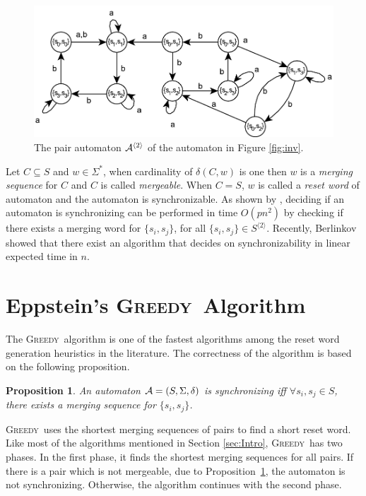 \documentclass[12pt]{article}
\newcommand{\kkcomm}[1]{{\color{red}{\bf kk: #1}}}
\newtheorem{proposition}{Proposition}[section]
\newcommand{\greedyAlgo}{\textsc{Greedy}}
\begin{document}
\begin{figure}[ht]
	\centering
	\includegraphics[width=\textwidth]{figs/pair.pdf}
	\caption{The pair automaton ${\cal A}^{\langle 2 \rangle}$ of the automaton in Figure \ref{fig:inv}.}
	\label{fig:pair}
\end{figure}

Let $C \subseteq S$ and $w \in \Sigma^*$, when cardinality of $\delta(C,w)$ is one then $w$ is a \textit{merging sequence} for $C$ and $C$ is called \textit{mergeable}. When $C=S$, $w$ is called a \textit{reset word} of automaton and the automaton is synchronizable. As shown by \cite{Eppstein90}, deciding if an automaton is synchronizing can be performed in time $O(pn^2)$ by checking if there exists a merging word for $\{ s_i, s_j \}$, for all  $\{ s_i, s_j \} \in S^{\langle 2 \rangle}$. 
Recently, Berlinkov \cite{Berlinkov2016} showed that there exist an algorithm that decides on synchronizability in linear expected time in $n$. 

\kkcomm{define Cerny automata here}

\clearpage
\section{Eppstein's \greedyAlgo\ Algorithm}
\label{sec:greedy}

The \greedyAlgo\ algorithm is one of the fastest algorithms among the reset word generation heuristics in the literature. The correctness of the algorithm is based on the following proposition.

\begin{proposition}
	\label{prop:synchronizable}
	An automaton ${\cal A}=(S,\Sigma,\delta)$ is synchronizing iff $\forall s_i,s_j \in S$, there exists a merging sequence for $\{ s_i, s_j \}$.
\end{proposition}

\noindent \greedyAlgo\  uses the shortest merging sequences of pairs to find a short reset word. Like most of the algorithms mentioned in Section \ref{sec:Intro}, \greedyAlgo\ has two  phases. In the first phase, it finds the shortest merging sequences for all pairs. If there is a pair which is not mergeable, due to Proposition~\ref{prop:synchronizable}, the automaton is not synchronizing. Otherwise, the algorithm continues with the second phase.
\end{document}
